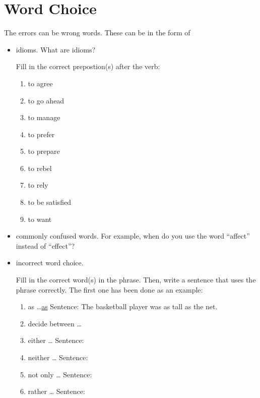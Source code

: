 \section{Word Choice}
The errors can be wrong words. These can be in the form of

\begin{itemize}
\item{idioms. What are idioms?} \hrulefill

Fill in the correct prepostion(s) after the verb:

\begin{enumerate}
\item to agree \hrulefill
\item to go ahead \hrulefill
\item to manage \hrulefill
\item to prefer \hrulefill
\item to prepare \hrulefill
\item to rebel \hrulefill
\item to rely \hrulefill
\item to be satisfied \hrulefill
\item to want \hrulefill
\end{enumerate}

\item{commonly confused words. For example, when do you use the word ``affect'' instead of ``effect''? } \hrulefill

\item{incorrect word choice.} 

Fill in the correct word(s) in the phrase. Then, write a sentence that uses the phrase correctly. The first one has been done as an example:

\begin{enumerate}
\item as \ldots \ul{as}
Sentence: The basketball player was as tall as the net.

 \item decide between \ldots \hrulefill 

\item either \dots \hrulefill
Sentence:

\item neither \ldots \hrulefill
Sentence:

\item not only \ldots \hrulefill
Sentence:

\item rather \ldots \hrulefill
Sentence:

\end{enumerate}
\end{itemize} 

